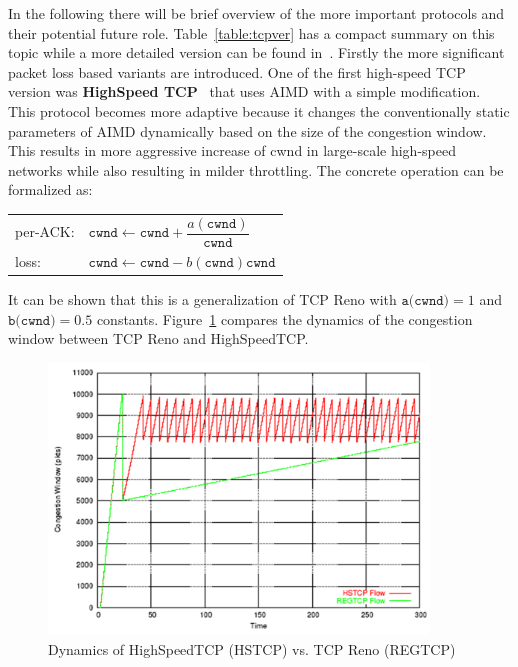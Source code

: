 \documentclass[a4paper]{article}
\begin{document}
In the following there will be brief overview of the more important protocols and their potential future role. Table~\ref{table:tcpver} has a compact summary on this topic while a more detailed version can be found in~\cite{TCPFairnessAnalysis}. Firstly the more significant packet loss based variants are introduced. One of the first high-speed TCP version was \textbf{HighSpeed TCP}~\cite{HighSpeedTCP} that uses AIMD with a simple modification. This protocol becomes more adaptive because it changes the conventionally static parameters of AIMD dynamically based on the size of the congestion window. This results in more aggressive increase of cwnd in large-scale high-speed networks while also resulting in milder throttling. The concrete operation can be formalized as:

\begin{tabular}{ll} 
per-ACK: & $\texttt{cwnd} \leftarrow \texttt{cwnd} + \dfrac{a(\texttt{cwnd})}{\texttt{cwnd}}$ \\
loss: & $\texttt{cwnd} \leftarrow \texttt{cwnd} - b(\texttt{cwnd})\texttt{cwnd}$ \\
\end{tabular} 

It can be shown that this is a generalization of TCP Reno with $\texttt{a(cwnd)}=1$ and $\texttt{b(cwnd)}=0.5$ constants. Figure~\ref{fig:HSvsReno} compares the dynamics of the congestion window between TCP Reno and HighSpeedTCP.


\begin{figure}[H]
    \centering
    \includegraphics[width=0.9\textwidth]{figures/HSTCP.png}
    \caption{Dynamics of HighSpeedTCP (HSTCP) vs. TCP Reno (REGTCP)}
    \label{fig:HSvsReno}
\end{figure}
\end{document}

